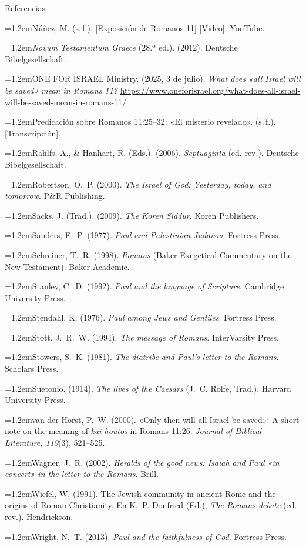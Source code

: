 \documentclass[hyperref={bookmarks=false},aspectratio=169]{beamer}
\newcommand{\refapa}[1]{\par\hangindent=1.2em\hangafter=1\noindent #1\par\vspace{3pt}}
\begin{document}
\begin{frame}[allowframebreaks]{Referencias}
\refapa{Núñez, M. (s.\,f.). [Exposición de Romanos 11] [Video]. YouTube.}
\refapa{\emph{Novum Testamentum Graece} (28.ª ed.). (2012). Deutsche Bibelgesellschaft.}
\refapa{ONE FOR ISRAEL Ministry. (2025, 3 de julio). \emph{What does «all Israel will be saved» mean in Romans 11?} \url{https://www.oneforisrael.org/what-does-all-israel-will-be-saved-mean-in-romans-11/}}
\refapa{Predicación sobre Romanos 11:25--32: «El misterio revelado». (s.\,f.). [Transcripción].}
\refapa{Rahlfs, A., \& Hanhart, R. (Eds.). (2006). \emph{Septuaginta} (ed. rev.). Deutsche Bibelgesellschaft.}
\refapa{Robertson, O.~P. (2000). \emph{The Israel of God: Yesterday, today, and tomorrow}. P\&R Publishing.}
\refapa{Sacks, J. (Trad.). (2009). \emph{The Koren Siddur}. Koren Publishers.}
\refapa{Sanders, E.~P. (1977). \emph{Paul and Palestinian Judaism}. Fortress Press.}
\refapa{Schreiner, T.~R. (1998). \emph{Romans} (Baker Exegetical Commentary on the New Testament). Baker Academic.}
\refapa{Stanley, C.~D. (1992). \emph{Paul and the language of Scripture}. Cambridge University Press.}
\refapa{Stendahl, K. (1976). \emph{Paul among Jews and Gentiles}. Fortress Press.}
\refapa{Stott, J.~R.~W. (1994). \emph{The message of Romans}. InterVarsity Press.}
\refapa{Stowers, S.~K. (1981). \emph{The diatribe and Paul's letter to the Romans}. Scholars Press.}
\refapa{Suetonio. (1914). \emph{The lives of the Caesars} (J.~C. Rolfe, Trad.). Harvard University Press.}
\refapa{van der Horst, P.~W. (2000). «Only then will all Israel be saved»: A short note on the meaning of \emph{kai houtōs} in Romans 11:26. \emph{Journal of Biblical Literature, 119}(3), 521--525.}
\refapa{Wagner, J.~R. (2002). \emph{Heralds of the good news: Isaiah and Paul «in concert» in the letter to the Romans}. Brill.}
\refapa{Wiefel, W. (1991). The Jewish community in ancient Rome and the origins of Roman Christianity. En K.~P. Donfried (Ed.), \emph{The Romans debate} (ed. rev.). Hendrickson.}
\refapa{Wright, N.~T. (2013). \emph{Paul and the faithfulness of God}. Fortress Press.}
\end{frame}
\end{document}
